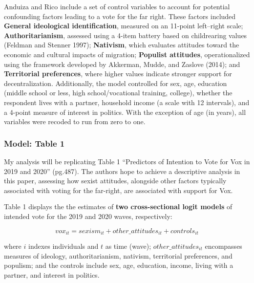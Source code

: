 \documentclass[
  letterpaper,
  DIV=11,
  numbers=noendperiod]{scrartcl}
\begin{document}
Anduiza and Rico include a set of control variables to account for
potential confounding factors leading to a vote for the far right. These
factors included \textbf{General ideological identification}, measured
on an 11-point left--right scale; \textbf{Authoritarianism}, assessed
using a 4-item battery based on childrearing values (Feldman and Stenner
1997); \textbf{Nativism}, which evaluates attitudes toward the economic
and cultural impacts of migration; \textbf{Populist attitudes},
operationalized using the framework developed by Akkerman, Mudde, and
Zaslove (2014); and \textbf{Territorial preferences}, where higher
values indicate stronger support for decentralization. Additionally, the
model controlled for sex, age, education (middle school or less, high
school/vocational training, college), whether the respondent lives with
a partner, household income (a scale with 12 intervals), and a 4-point
measure of interest in politics. With the exception of age (in years),
all variables were recoded to run from zero to one.

\subsubsection{Model: Table 1}\label{model-table-1}

My analysis will be replicating Table 1 ``Predictors of Intention to
Vote for Vox in 2019 and 2020'' (pg.487). The authors hope to achieve a
descriptive analysis in this paper, assessing how sexist attitudes,
alongside other factors typically associated with voting for the
far-right, are associated with support for Vox.

Table 1 displays the the estimates of \textbf{two cross-sectional logit
models} of intended vote for the 2019 and 2020 waves, respectively:

\[
vox_{it} = sexism_{it} + other\_attitudes_{it} + controls_{it}
\]

where \(i\) indexes individuals and \(t\) as time (wave);
\(other\_attitudes_{it}\) encompasses measures of ideology,
authoritarianism, nativism, territorial preferences, and populism; and
the controls include sex, age, education, income, living with a partner,
and interest in politics.
\end{document}
